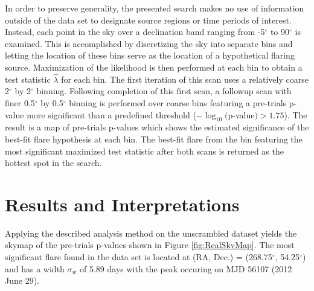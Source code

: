 \documentclass[manuscript]{aastex}
\begin{document}
In order to preserve generality, the presented search makes no use of information outside of the data set to designate source regions or time periods of interest. Instead, each point in the sky over a declination band ranging from -5$^{\circ}$ to 90$^{\circ}$ is examined. This is accomplished by discretizing the sky into separate bins and letting the location of these bins serve as the location of a hypothetical flaring source. Maximization of the likelihood is then performed at each bin to obtain a test statistic $\hat{\lambda}$ for each bin. The first iteration of this scan uses a relatively coarse 2$^{\circ}$ by 2$^{\circ}$ binning. Following completion of this first scan, a followup scan with finer 0.5$^{\circ}$ by 0.5$^{\circ}$ binning is performed over coarse bins featuring a pre-trials p-value more significant than a predefined threshold ($-\log_{10}($p-value$) > 1.75$). The result is a map of pre-trials p-values which shows the estimated significance of the best-fit flare hypothesis at each bin. The best-fit flare from the bin featuring the most significant maximized test statistic after both scans is returned as the hottest spot in the search.

\section{Results and Interpretations}
Applying the described analysis method on the unscrambled dataset yields the skymap of the pre-trials p-values shown in Figure \ref{fig:RealSkyMap}. The most significant flare found in the data set is located at (RA, Dec.) = (268.75$^{\circ}$, 54.25$^{\circ}$) and has a width $\sigma_w$ of 5.89 days with the peak occuring on MJD 56107 (2012 June 29). 
\end{document}
